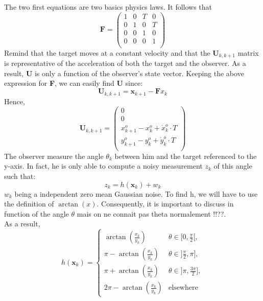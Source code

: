 \documentclass[a4paper,12pt]{report}
\begin{document}
The two first equations are two basics physics laws.  
It follows that \[\textbf{F} = 
   \left (
   \begin{array}{cccc}
      1 & 0 & T & 0 \\
      0 & 1 & 0 & T \\
      0 & 0 & 1 & 0 \\
      0 & 0 & 0 & 1 \\
   \end{array}
   \right )
\]
Remind that the target moves at a constant velocity and that the $\textbf{U}_{k,k+1}$ matrix is representative of the acceleration of both the target and the observer. As a result, \textbf{U} is only a function of the observer's state vector. Keeping the above expression for \textbf{F}, we can easily find \textbf{U} since:
\begin{equation*}
\textbf{U}_{k,k+1} = \textbf{x}_{k+1} - \textbf{F} x_{k}
\end{equation*}
Hence, \[\textbf{U}_{k,k+1} = 
   \left (
   \begin{array}{c}
      0 \\
      0 \\
      x^{o}_{k+1} - x^{o}_{k} + \dot{x}^{o}_{k} \cdot T \\
      y^{o}_{k+1} - y^{o}_{k} + \dot{y}^{o}_{k} \cdot T \\
   \end{array}
   \right )
\]
The observer measure the angle $\theta_{k}$ between him and the target referenced to the y-axis. In fact, he is only able to compute a noisy measurement $z_{k}$ of this angle such that:
\begin{equation*}
z_{k} = h(\textbf{x}_{k}) + w_{k}
\end{equation*}
$w_{k}$ being a independent zero mean Gaussian noise.
To find h, we will have to use the definition of $\arctan(x)$. Consequently, it is important to discuss in function of the angle $\theta$ {\color{red} mais on ne connait pas theta normalement !!??}.\\ As a result,
\begin{equation*}
      h(\textbf{x}_{k}) =
     \begin{cases}
      \arctan(\frac{x_{k}}{y_{k}}) &  \theta \in [0,\frac{\pi}{2}[,\\
      \pi - \arctan(\frac{x_{k}}{y_{k}}) &   \theta \in ]\frac{\pi}{2},\pi] ,\\
      \pi + \arctan(\frac{x_{k}}{y_{k}}) &   \theta \in ]\pi,\frac{3 \pi}{2}], \\
      2\pi - \arctan(\frac{x_{k}}{y_{k}}) & \text{elsewhere}
     \end{cases}
\end{equation*}
\end{document}
